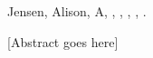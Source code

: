 \setcounter{page}{1}

\noindent
Jensen, Alison, A, \textit{\thesistitle}, \degreename, \departmentname, \graduationmonth, \graduationyear.

\vspace{\baselineskip}

[Abstract goes here]

\clearpage

